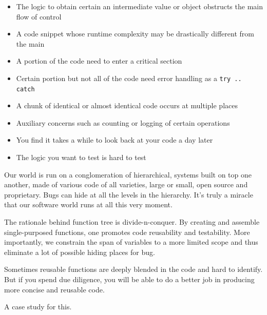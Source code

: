 \documentclass[oneside,11pt]{book}
\theoremstyle{definition}
\theoremstyle{remark}
\newcommand{\code}[1]{\mbox{\lstinline{#1}}}
\begin{document}
\begin{itemize}
    \item The logic to obtain certain an intermediate value or object obstructs the main flow of
    control
    \item A code snippet whose runtime complexity may be drastically different from the main
    \item A portion of the code need to enter a critical section
    \item Certain portion but not all of the code need error handling as a \code{try .. catch}
    \item A chunk of identical or almost identical code occurs at multiple places
    \item Auxiliary concerns such as counting or logging of certain operations
    \item You find it takes a while to look back at your code a day later
    \item The logic you want to test is hard to test
\end{itemize}

Our world is run on a conglomeration of hierarchical, systems built on top one another, made of
various code of all varieties, large or small, open source and proprietary.
Bugs can hide at all the levels in the hierarchy.
It's truly a miracle that our software world runs at all this very moment.



The rationale behind function tree is divide-n-conquer.
By creating and assemble single-purposed functions, one promotes code reusability and testability.
More importantly, we constrain the span of variables to a more limited scope and thus
eliminate a lot of possible hiding places for bug.



Sometimes reusable functions are deeply blended in the code and hard to identify.
But if you spend due diligence, you will be able to do a better job in producing more concise and
reusable code.

A case study for this.

\label{Evernote:Rotate array by k times}
\label{Evernote:Search for start and end of a target in a sorted array}








\end{document}
